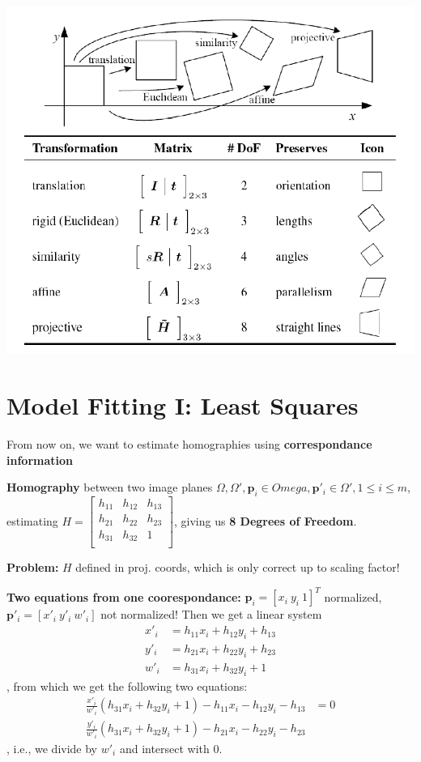\includegraphics[width=\textwidth]{images/chap5/summ_coord_trans}

\section{Model Fitting I: Least Squares}

From now on, we want to estimate homographies using \textbf{correspondance information}

\textbf{Homography} between two image planes $\Omega, \Omega', \mathbf{p}_i \in Omega, \mathbf{p}'_i \in \Omega', 1 \leq i \leq m$, estimating $H =  \left[\begin{matrix}
h_{11} & h_{12} & h_{13} \\
h_{21} & h_{22} & h_{23} \\
h_{31} & h_{32} & 1 \\
\end{matrix}\right]$, giving us \textbf{8 Degrees of Freedom}.

\textbf{Problem:} $H$ defined in proj. coords, which is only correct up to scaling factor!

\textbf{Two equations from one coorespondance:} $\mathbf{p}_i = [x_i \ y_i \ 1]^T$ normalized, $\mathbf{p}'_i = [x'_i \ y'_i \ w'_i]$ not normalized! Then we get a linear system \begin{align*}
    x'_i & = h_{11} x_i + h_{12} y_i + h_{13} \\
    y'_i & = h_{21} x_i + h_{22} y_i + h_{23} \\
    w'_i & = h_{31} x_i + h_{32} y_i + 1
\end{align*}, from which we get the following two equations: \begin{align*}
    \frac{x'_i}{w'_i} (h_{31} x_i + h_{32} y_i + 1) - h_{11} x_i - h_{12} y_i - h_{13} & = 0 \\
    \frac{y'_i}{w'_i} (h_{31} x_i + h_{32} y_i + 1) - h_{21} x_i - h_{22} y_i - h_{23}
\end{align*}, i.e., we divide by $w'_i$ and intersect with $0$.

